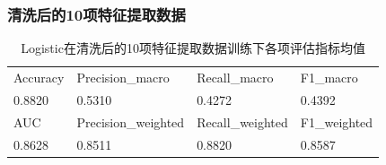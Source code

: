 \documentclass[10pt]{article}
\begin{document}
\subsubsection*{清洗后的10项特征提取数据}
\begin{table}[H]
  \centering
  \caption{Logistic在清洗后的10项特征提取数据训练下各项评估指标均值}
  \begin{tabular}{llll}
  \toprule
  Accuracy & Precision\_macro & Recall\_macro & F1\_macro \\
  0.8820 & 0.5310 & 0.4272 & 0.4392 \\
  \midrule
  AUC & Precision\_weighted & Recall\_weighted & F1\_weighted \\
  0.8628 & 0.8511 & 0.8820 & 0.8587 \\
  \bottomrule
  \end{tabular}
\end{table}
\end{document}
